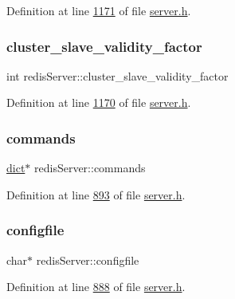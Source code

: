 Definition at line \hyperlink{server_8h_source_l01171}{1171} of file \hyperlink{server_8h_source}{server.\+h}.

\mbox{\label{structredisServer_a28275ce825f03a13685ace42af3c0fc5}} 
\subsubsection{\texorpdfstring{cluster\+\_\+slave\+\_\+validity\+\_\+factor}{cluster\_slave\_validity\_factor}}
{\footnotesize\ttfamily int redis\+Server\+::cluster\+\_\+slave\+\_\+validity\+\_\+factor}



Definition at line \hyperlink{server_8h_source_l01170}{1170} of file \hyperlink{server_8h_source}{server.\+h}.

\mbox{\label{structredisServer_aeb2b5b88b7812247c8e4466c87619fbd}} 
\subsubsection{\texorpdfstring{commands}{commands}}
{\footnotesize\ttfamily \hyperlink{structdict}{dict}$\ast$ redis\+Server\+::commands}



Definition at line \hyperlink{server_8h_source_l00893}{893} of file \hyperlink{server_8h_source}{server.\+h}.

\mbox{\label{structredisServer_a7a96c968e97362728bc48a503cfe2bfb}} 
\subsubsection{\texorpdfstring{configfile}{configfile}}
{\footnotesize\ttfamily char$\ast$ redis\+Server\+::configfile}



Definition at line \hyperlink{server_8h_source_l00888}{888} of file \hyperlink{server_8h_source}{server.\+h}.

